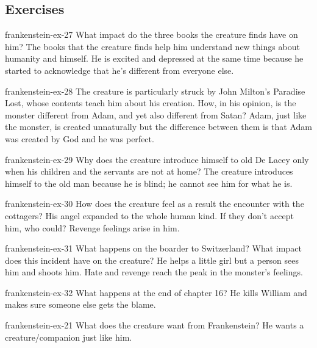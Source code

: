 \documentclass[preview]{standalone}
\begin{document}
\genpage

\subsection{Exercises}

\begin{snippetexercise}{frankenstein-ex-27}
    {What impact do the three books the creature finds have on him?}
    The books that the creature finds help him understand new things
    about humanity and himself. He is excited and depressed at the same time because
    he started to acknowledge that he's different from everyone else.
\end{snippetexercise}

\begin{snippetexercise}{frankenstein-ex-28}
    {The creature is particularly struck by John Milton's Paradise Lost, whose contents teach him about his
    creation. How, in his opinion, is the monster different from Adam, and yet also different from Satan?}
    Adam, just like the monster, is created unnaturally but the difference
    between them is that Adam was created by God and he was perfect. 
\end{snippetexercise}

\begin{snippetexercise}{frankenstein-ex-29}
    {Why does the creature introduce himself to old De Lacey only when his children and the servants are not
    at home?}
    The creature introduces himself to the old man because he is blind; he cannot see him
    for what he is.
\end{snippetexercise}

\begin{snippetexercise}{frankenstein-ex-30}
    {How does the creature feel as a result the encounter with the cottagers?}
    His angel expanded to the whole human kind.
    If they don't accept him, who could? Revenge feelings
    arise in him. 
\end{snippetexercise}

\begin{snippetexercise}{frankenstein-ex-31}
    {What happens on the boarder to Switzerland? What impact does this incident have on the creature?}
    He helps a little girl but a person sees him and shoots him.
    Hate and revenge reach the peak in the monster's feelings.
\end{snippetexercise}

\begin{snippetexercise}{frankenstein-ex-32}
    {What happens at the end of chapter 16?}
    He kills William and makes sure someone else gets the blame.
\end{snippetexercise}

\begin{snippetexercise}{frankenstein-ex-21}
    {What does the creature want from Frankenstein?}
    He wants a creature/companion just like him.
\end{snippetexercise}
\end{document}

